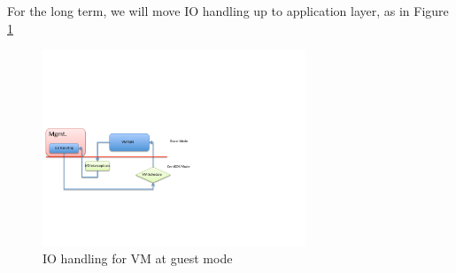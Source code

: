 \documentclass[a4paper,12pt]{article}
\begin{document}
For the long term, we will move IO handling up to application layer,  as in Figure \ref{fig:iohandling2}
\begin{figure}[!ht]
 \centerline{
 \includegraphics[width=0.7\textwidth]{IO_handling2}}
 \caption{IO handling for VM at guest mode} \label{fig:iohandling2}
\end{figure}
\end{document}
